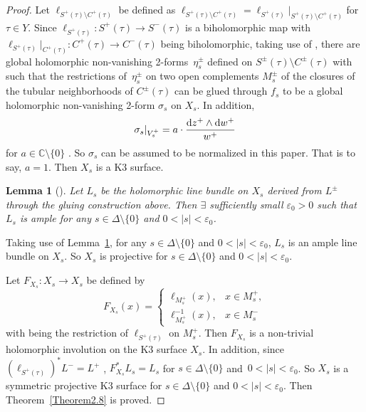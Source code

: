 \documentclass[10pt,a4paper]{amsart}
\numberwithin{equation}{section}
\newtheorem{Lemma}[Theorem]{Lemma}
\begin{document}
\begin{proof}
Let $\ell_{S^+(\tau)\setminus C^+(\tau)}$ be defined as $\ell_{S^+(\tau)\setminus C^+(\tau)}=\ell_{S^+(\tau)}|_{S^+(\tau)\setminus C^+(\tau)}$ for $\tau \in Y$. Since $\ell_{S^+(\tau)}\colon S^+(\tau)\rightarrow S^-(\tau)$ is a biholomorphic map with $\ell_{S^+(\tau)}|_{C^{+}(\tau)}\colon C^+(\tau)\rightarrow C^-(\tau)$ being biholomorphic, taking use of \cite[Proposition~2.1]{Takayuki-Takato1}, there are global holomorphic non-vanishing 2-forms~$\eta^{\pm}_s$ defined on $S^{\pm}(\tau)\setminus C^{\pm}(\tau)$ with  such that the restrictions of~$\eta^{\pm}_s$ on two open complements $M^{\pm}_s$ of the closures of the tubular neighborhoods of $C^{\pm}(\tau)$ can be glued through $f_s$ to be a global holomorphic non-vanishing 2-form $\sigma_s$ on $X_s$. In addition,
\[\sigma_s|_{V^+_s}=a\cdot \frac{{\rm d}z^+ \wedge {\rm d}w^+}{w^+}\]
for $a \in \mathbb{C} \setminus \{ 0 \}$ . So $\sigma_s$ can be assumed to be normalized in this paper. That is to say, $a=1$. Then $X_s$ is a K3 surface.

\begin{Lemma}[{\cite[Theorem~1.2]{Takayuki-Takato2}}]\label{Lemma2.9} Let $L_s$ be the holomorphic line bundle on $X_s$ derived from $L^{\pm}$ through the gluing construction above. Then $\exists$ sufficiently small $\varepsilon_0 >0$ such that $L_s$ is ample for any $s \in \Delta \setminus \{ 0\} $ and $0<|s|<\varepsilon_0$.
\end{Lemma}

Taking use of Lemma~\ref{Lemma2.9}, for any $s \in \Delta \setminus \{ 0\} $ and $0<|s|<\varepsilon_0$, $L_s$ is an ample line bundle on $X_s$. So $X_s$ is projective for $s \in \Delta \setminus \{ 0\} $ and $0<|s|<\varepsilon_0$.

Let $F_{X_s}\colon X_s \rightarrow X_s$ be defined by
\[F_{X_s}(x)=\begin{cases}
\ell_{M^+_s}(x), &x \in M^{+}_s,\\
\ell^{-1}_{M^+_s}(x), &x \in M^{-}_s
\end{cases}\]
with  being the restriction of $\ell_{S^{+}(\tau)}$ on $M^{+}_s$. Then $F_{X_s}$ is a non-trivial holomorphic involution on the K3 surface $X_s$. In addition, since $(\ell_{S^{+}(\tau)})^*L^{-}=L^{+}$ , $F^{*}_{X_s}L_s=L_s$ for $s \in \Delta \setminus \{ 0\} $ and~${0<|s|<\varepsilon_0}$. So $X_s$ is a symmetric projective K3 surface for $s \in \Delta \setminus \{ 0\} $ and $0<|s|<\varepsilon_0$. Then Theorem~\ref{Theorem2.8} is proved.
\end{proof}
\end{document}

